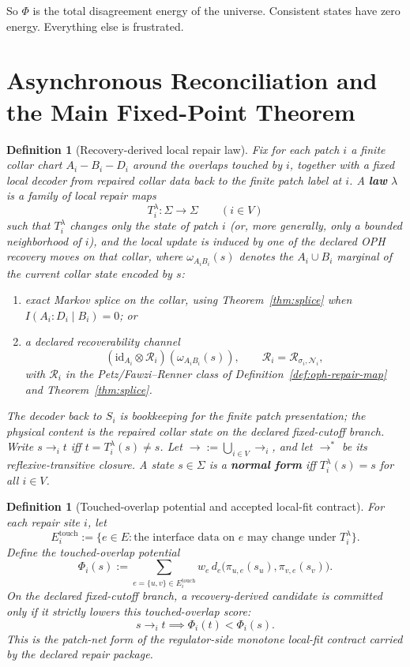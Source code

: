 \documentclass[11pt]{article}
\newtheorem{definition}[theorem]{Definition}
\theoremstyle{remark}
\theoremstyle{plain}
\begin{document}
So $\Phi$ is the total disagreement energy of the universe. Consistent states have zero energy. Everything else is frustrated.


\section{Asynchronous Reconciliation and the Main Fixed-Point Theorem}

\begin{definition}[Recovery-derived local repair law]\label{def:repair}
Fix for each patch \(i\) a finite collar chart \(A_i\!-\!B_i\!-\!D_i\) around the overlaps touched
by \(i\), together with a fixed local decoder from repaired collar data back to the finite patch
label at \(i\). A \textbf{law} \(\lambda\) is a family of local repair maps
\[
T_i^\lambda:\Sigma\to\Sigma
\qquad (i\in V)
\]
such that \(T_i^\lambda\) changes only the state of patch \(i\) (or, more generally, only a
bounded neighborhood of \(i\)), and the local update is induced by one of the declared OPH
recovery moves on that collar, where \(\omega_{A_iB_i}(s)\) denotes the \(A_i\cup B_i\) marginal
of the current collar state encoded by \(s\):
\begin{enumerate}[label=(\roman*),leftmargin=2em]
\item exact Markov splice on the collar, using Theorem~\ref{thm:splice} when
      \(I(A_i:D_i\mid B_i)=0\); or
\item a declared recoverability channel
\[
(\mathrm{id}_{A_i}\otimes \mathcal R_i)(\omega_{A_iB_i}(s)),
\qquad
\mathcal R_i=\mathcal R_{\sigma_i,\mathcal N_i},
\]
      with \(\mathcal R_i\) in the Petz/Fawzi--Renner class of
      Definition~\ref{def:oph-repair-map} and Theorem~\ref{thm:splice}.
\end{enumerate}
The decoder back to \(S_i\) is bookkeeping for the finite patch presentation; the physical content
is the repaired collar state on the declared fixed-cutoff branch. Write \(s\to_i t\) iff
\(t=T_i^\lambda(s)\neq s\). Let \(\to := \bigcup_{i\in V}\to_i\), and let \(\to^*\) be its
reflexive-transitive closure. A state \(s\in\Sigma\) is a \textbf{normal form} iff
\(T_i^\lambda(s)=s\) for all \(i\in V\).
\end{definition}

\begin{definition}[Touched-overlap potential and accepted local-fit contract]\label{def:localfit}
For each repair site \(i\), let
\[
E_i^{\mathrm{touch}}
:=
\bigl\{
e\in E:\text{the interface data on }e\text{ may change under }T_i^\lambda
\bigr\}.
\]
Define the touched-overlap potential
\[
\Phi_i(s)
:=
\sum_{e=\{u,v\}\in E_i^{\mathrm{touch}}}
w_e\, d_e\!\bigl(\pi_{u,e}(s_u),\pi_{v,e}(s_v)\bigr).
\]
On the declared fixed-cutoff branch, a recovery-derived candidate is committed only if it
strictly lowers this touched-overlap score:
\[
s\to_i t \implies \Phi_i(t)<\Phi_i(s).
\]
This is the patch-net form of the regulator-side monotone local-fit contract carried by the
declared repair package.
\end{definition}
\end{document}
